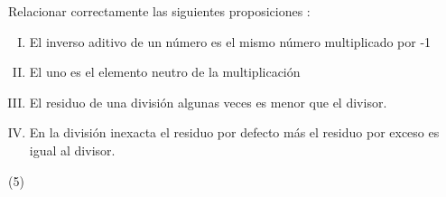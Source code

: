 \item{Relacionar correctamente las siguientes proposiciones :
	\begin{enumerate}[I.]
	\item El inverso aditivo de un número es el mismo número multiplicado por -1
	\item El uno es el elemento neutro de la multiplicación
	\item El residuo de una división algunas veces es menor que el divisor.
	\item En la división inexacta el residuo por defecto más el residuo por exceso es igual al divisor.
	\end{enumerate}

	\begin{tasks}(5)
	\end{tasks}
}